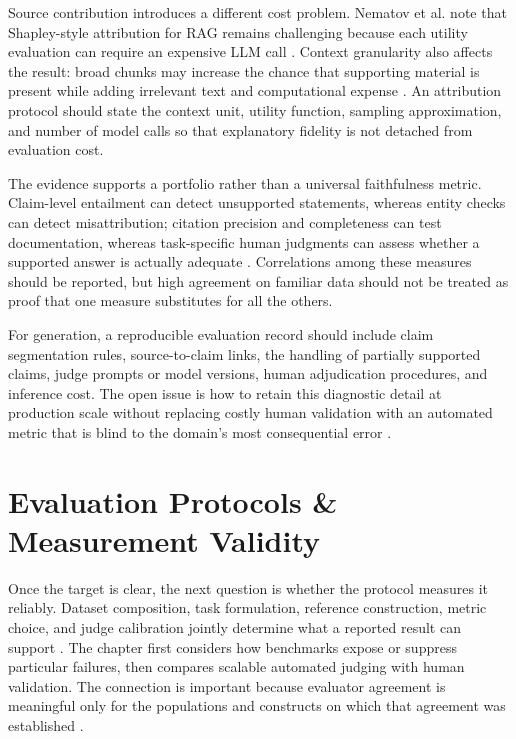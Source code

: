 \documentclass[a4paper,11pt]{article}
\begin{document}
Source contribution introduces a different cost problem. Nematov et al. note that Shapley-style attribution for RAG remains challenging because each utility evaluation can require an expensive LLM call \citep{Nematov2025Source}. Context granularity also affects the result: broad chunks may increase the chance that supporting material is present while adding irrelevant text and computational expense \citep{Belinchon2026Effect}. An attribution protocol should state the context unit, utility function, sampling approximation, and number of model calls so that explanatory fidelity is not detached from evaluation cost.

The evidence supports a portfolio rather than a universal faithfulness metric. Claim-level entailment can detect unsupported statements, whereas entity checks can detect misattribution; citation precision and completeness can test documentation, whereas task-specific human judgments can assess whether a supported answer is actually adequate \citep{SaadFalcon2023Ares,Caruzzo2026Deceptive,Murugaraj2025Ragvue}. Correlations among these measures should be reported, but high agreement on familiar data should not be treated as proof that one measure substitutes for all the others.

For generation, a reproducible evaluation record should include claim segmentation rules, source-to-claim links, the handling of partially supported claims, judge prompts or model versions, human adjudication procedures, and inference cost. The open issue is how to retain this diagnostic detail at production scale without replacing costly human validation with an automated metric that is blind to the domain's most consequential error \citep{Nematov2025Source,Caruzzo2026Deceptive}.
\section{Evaluation Protocols \& Measurement Validity}


Once the target is clear, the next question is whether the protocol measures it reliably. Dataset composition, task formulation, reference construction, metric choice, and judge calibration jointly determine what a reported result can support \citep{Zhang2026Before,Li2026Mrag,Ding2026Attribution}. The chapter first considers how benchmarks expose or suppress particular failures, then compares scalable automated judging with human validation. The connection is important because evaluator agreement is meaningful only for the populations and constructs on which that agreement was established \citep{SaadFalcon2023Ares,Murugaraj2025Ragvue,Caruzzo2026Deceptive}.
\end{document}
